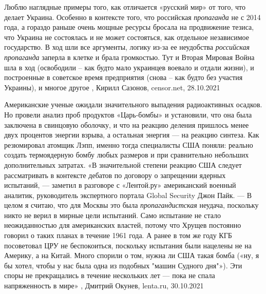 Люблю наглядные примеры того, как отличается «русский мир» от того, что делает
Украина. Особенно в контексте того, что российская \emph{пропаганда} не с 2014 года, а
гораздо раньше очень мощные ресурсы бросала на продвижение тезиса, что Украина
не состоялась и не может состояться, как отдельное независимое государство. В
ход шли все аргументы, логику из-за ее неудобства \emph{российская пропаганда} заперла
в клетке и брала громкостью. Тут и Вторая Мировая Война шла в ход (освободили –
как будто мало украинцев воевало и отдали жизни), и построенные в советское
время предприятия (снова – как будто без участия Украины), и многое другое 
, Кирилл Сазонов, censor.net, 28.10.2021%

Американские ученые ожидали значительного выпадения радиоактивных осадков. Но
провели анализ проб продуктов «Царь-бомбы» и установили, что она была заключена
в свинцовую оболочку, и что на реакцию деления пришлось менее двух процентов
энергии взрыва, а остальная энергия — на реакцию синтеза. Как резюмировал
атомщик Лэпп, именно тогда специалисты США поняли: реально создать термоядерную
бомбу любых размеров и при сравнительно небольших дополнительных затратах.
«В значительной степени реакцию США следует рассматривать в контексте дебатов
по договору о запрещении ядерных испытаний, — заметил в разговоре с «Лентой.ру»
американский военный аналитик, руководитель экспертного портала Global Security
Джон Пайк. — В целом я считаю, что для Москвы это была \emph{пропагандистская}
неудача, поскольку никто не верил в мирные цели испытаний. Само испытание не
стало неожиданностью для американских властей, потому что Хрущев постоянно
говорил о таких планах в течение 1961 года. А ранее в том же году КГБ
посоветовал ЦРУ не беспокоиться, поскольку испытания были нацелены не на
Америку, а на Китай. Много спорили о том, нужна ли США такая бомба («ну, я бы
хотел, чтобы у нас была одна из подобных "машин Судного дня"»). Эти споры не
прекращались в течение нескольких лет — пока не спала напряженность в мире»
, Дмитрий Окунев, lenta.ru, 30.10.2021
